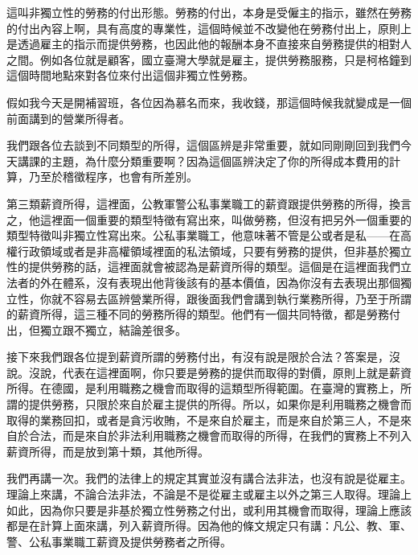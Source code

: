 \documentclass[]{ctexbook}
\begin{document}
這叫非獨立性的勞務的付出形態。勞務的付出，本身是受僱主的指示，雖然在勞務的付出內容上啊，具有高度的專業性，這個時候並不改變他在勞務付出上，原則上是透過雇主的指示而提供勞務，也因此他的報酬本身不直接來自勞務提供的相對人之間。例如各位就是顧客，國立臺灣大學就是雇主，提供勞務服務，只是柯格鐘到這個時間地點來對各位來付出這個非獨立性勞務。

假如我今天是開補習班，各位因為慕名而來，我收錢，那這個時候我就變成是一個前面講到的營業所得者。

我們跟各位去談到不同類型的所得，這個區辨是非常重要，就如同剛剛回到我們今天講課的主題，為什麼分類重要啊？因為這個區辨決定了你的所得成本費用的計算，乃至於稽徵程序，也會有所差別。

第三類薪資所得，這裡面，公教軍警公私事業職工的薪資跟提供勞務的所得，換言之，他這裡面一個重要的類型特徵有寫出來，叫做勞務，但沒有把另外一個重要的類型特徵叫非獨立性寫出來。公私事業職工，他意味著不管是公或者是私------在高權行政領域或者是非高權領域裡面的私法領域，只要有勞務的提供，但非基於獨立性的提供勞務的話，這裡面就會被認為是薪資所得的類型。這個是在這裡面我們立法者的外在體系，沒有表現出他背後該有的基本價值，因為你沒有去表現出那個獨立性，你就不容易去區辨營業所得，跟後面我們會講到執行業務所得，乃至于所謂的薪資所得，這三種不同的勞務所得的類型。他們有一個共同特徵，都是勞務付出，但獨立跟不獨立，結論差很多。

接下來我們跟各位提到薪資所謂的勞務付出，有沒有說是限於合法？答案是，沒說。沒說，代表在這裡面啊，你只要是勞務的提供而取得的對價，原則上就是薪資所得。在德國，是利用職務之機會而取得的這類型所得範圍。在臺灣的實務上，所謂的提供勞務，只限於來自於雇主提供的所得。所以，如果你是利用職務之機會而取得的業務回扣，或者是貪污收賄，不是來自於雇主，而是來自於第三人，不是來自於合法，而是來自於非法利用職務之機會而取得的所得，在我們的實務上不列入薪資所得，而是放到第十類，其他所得。

我們再講一次。我們的法律上的規定其實並沒有講合法非法，也沒有說是從雇主。理論上來講，不論合法非法，不論是不是從雇主或雇主以外之第三人取得。理論上如此，因為你只要是非基於獨立性勞務之付出，或利用其機會而取得，理論上應該都是在計算上面來講，列入薪資所得。因為他的條文規定只有講：凡公、教、軍、警、公私事業職工薪資及提供勞務者之所得。
\end{document}
